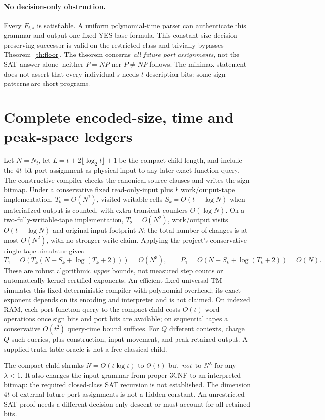 \documentclass[11pt]{article}
\begin{document}
\paragraph{No decision-only obstruction.}
Every $F_{t,s}$ is satisfiable. A uniform polynomial-time parser can authenticate this grammar and output one fixed YES base formula. This constant-size decision-preserving successor is valid on the restricted class and trivially bypasses Theorem~\ref{th:floor}. The theorem concerns \emph{all future port assignments}, not the SAT answer alone; neither $P=NP$ nor $P\ne NP$ follows. The minimax statement does not assert that every individual $s$ needs $t$ description bits: some sign patterns are short programs.

\section{Complete encoded-size, time and peak-space ledgers}
Let $N=N_t$, let $L=t+2\lfloor\log_2t\rfloor+1$ be the compact child length, and include the $4t$-bit port assignment as physical input to any later exact function query. The constructive compiler checks the canonical source clauses and writes the sign bitmap. Under a conservative fixed read-only-input plus $k$ work/output-tape implementation, $T_k=O(N^2)$, visited writable cells $S_k=O(t+\log N)$ when materialized output is counted, with extra transient counters $O(\log N)$. On a two-fully-writable-tape implementation, $T_2=O(N^2)$, work/output visits $O(t+\log N)$ and original input footprint $N$; the total number of changes is at most $O(N^2)$, with no stronger write claim. Applying the project's conservative single-tape simulator gives
\[
 T_1=O\!\left(T_k(N+S_k+\log(T_k+2))\right)=O(N^3),\qquad
 P_1=O(N+S_k+\log(T_k+2))=O(N).
\]
These are robust algorithmic \emph{upper} bounds, not measured step counts or automatically kernel-certified exponents. An efficient fixed universal TM simulates this fixed deterministic compiler with polynomial overhead; its exact exponent depends on its encoding and interpreter and is not claimed. On indexed RAM, each port function query to the compact child costs $O(t)$ word operations once sign bits and port bits are available; on sequential tapes a conservative $O(t^2)$ query-time bound suffices. For $Q$ different contexts, charge $Q$ such queries, plus construction, input movement, and peak retained output. A supplied truth-table oracle is not a free classical child.

The compact child shrinks $N=\Theta(t\log t)$ to $\Theta(t)$ but \,\emph{not}\, to $N^\lambda$ for any $\lambda<1$. It also changes the input grammar from proper 3CNF to an interpreted bitmap: the required closed-class SAT recursion is not established. The dimension $4t$ of external future port assignments is not a hidden constant. An unrestricted SAT proof needs a different decision-only descent or must account for all retained bits.
\end{document}
